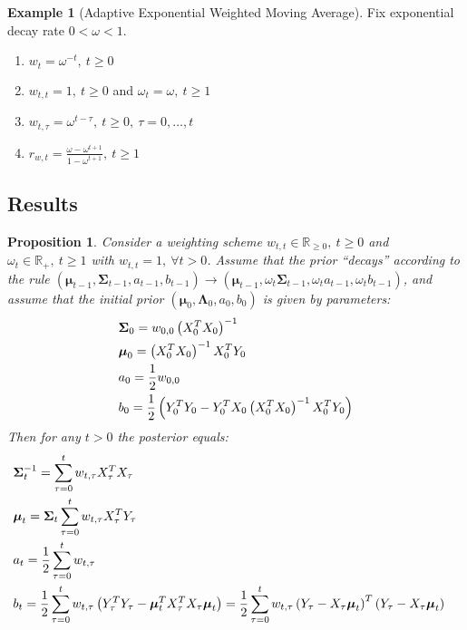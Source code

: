 \documentclass[10pt,fleqn]{amsart}
\newtheorem{proposition}[theorem]{Proposition}
\theoremstyle{definition}
\newtheorem{example}[theorem]{Example}
\theoremstyle{remark}
\numberwithin{equation}{section}
\newcommand{\RR}{\mathbb{R}}
\newcommand{\mmu}{\boldsymbol{\mu}}
\newcommand{\SSigma}{\boldsymbol{\Sigma}}
\newcommand{\LLambda}{\boldsymbol{\Lambda}}
\newcommand{\fXTX}[1]{X_{#1}^TX_{#1}}
\newcommand{\fXTY}[1]{X_{#1}^TY_{#1}}
\newcommand{\fYTY}[1]{Y_{#1}^TY_{#1}}
\newcommand{\fXTXi}[1]{\left(X_{#1}^TX_{#1}\right)^{-1}}
\begin{document}
\begin{example}[Adaptive Exponential Weighted Moving Average]\label{aewmawt} Fix exponential decay rate $0<\omega<1$.
\begin{enumerate}
    \item $\displaystyle w_t=\omega^{-t},\ t\geq 0$
    \item $\displaystyle w_{t,t}=1,\ t\geq 0$ and $\omega_t=\omega,\ t\geq 1$
    \item $\displaystyle w_{t,\tau}=\omega^{t-\tau},\ t\geq 0,\ \tau=0,\ldots,t$
    \item $\displaystyle r_{w,t}=\frac{\omega-\omega^{t+1}}{1-\omega^{t+1}},\ t\geq 1$
\end{enumerate}
\end{example}
\subsection{Results}
\begin{proposition}\label{weightingbayes}
Consider a weighting scheme $w_{t,t}\in\RR_{\geq 0},\ t\geq 0$ and $\omega_t\in \RR_+,\ t\geq 1$
with $w_{t,t}=1,\ \forall t>0$.
Assume that the prior ``decays'' according to the rule
$\left(\mmu_{t-1},\SSigma_{t-1},a_{t-1},b_{t-1}\right)\rightarrow \left(\mmu_{t-1},\omega_t \SSigma_{t-1},\omega_t a_{t-1},\omega_t b_{t-1}\right)$,
and assume that the initial prior $\left(\mmu_0,\LLambda_0, a_0, b_0\right)$ is given by parameters:
\begin{align}\displaystyle
    &\SSigma_0=w_{0,0}\fXTXi{0}\\
    &\mmu_0=\fXTXi{0}\fXTY{0}\\
    &a_0=\frac 12w_{0,0}\\
    &b_0=\frac 12\left(Y_0^TY_0-Y_0^TX_0\fXTXi{0}\fXTY{0}\right)
\end{align}
Then for any $t>0$ the posterior equals:
\begin{align}\displaystyle
    \label{posterior_vart}&\SSigma_t^{-1}=\sum_{\tau=0}^t w_{t,\tau}\fXTX{\tau}&&\\
    \label{posterior_mut}&\mmu_t=\SSigma_t\sum_{\tau=0}^t w_{t,\tau}\fXTY{\tau}&&\\
    \label{posterior_at}&a_t=\frac 12\sum_{\tau=0}^t w_{t,\tau}&&\\
    \label{posterior_bt}&b_t=\frac 12\sum_{\tau=0}^t w_{t,\tau}\left(\fYTY{\tau}-\mmu_t^T\fXTX{\tau}\mmu_t\right)=
    \frac 12\sum_{\tau=0}^t w_{t,\tau}\left(Y_\tau-X_\tau\mmu_t\right)^T\left(Y_\tau-X_\tau\mmu_t\right)&&
\end{align}
\end{proposition}
\end{document}

